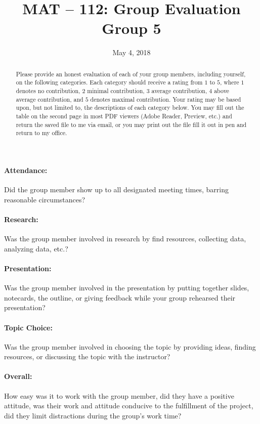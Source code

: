 \documentclass{article}
\title{MAT -- 112: Group Evaluation\\
\large{Group 5}}
\date{May 4, 2018}
\begin{document}
\maketitle

\begin{abstract}
Please provide an honest evaluation of each of your group members, including yourself, on the following categories. Each category should receive a rating from $1$ to $5$, where $1$ denotes no contribution, $2$ minimal contribution, $3$ average contribution, $4$ above average contribution, and $5$ denotes maximal contribution.  Your rating may be based upon, but not limited to, the descriptions of each category below. You may fill out the table on the second page in most PDF viewers (Adobe Reader, Preview, etc.) and return the saved file to me via email, or you may print out the file fill it out in pen and return to my office. 
\end{abstract}

\paragraph*{Attendance:} Did the group member show up to all designated meeting times, barring reasonable circumstances?
\paragraph*{Research:} Was the group member involved in research by find resources, collecting data, analyzing data, etc.?
\paragraph*{Presentation:} Was the group member involved in the presentation by putting together slides, notecards, the outline, or giving feedback while your group rehearsed their presentation?
\paragraph*{Topic Choice:} Was the group member involved in choosing the topic by providing ideas, finding resources, or discussing the topic with the instructor?
\paragraph*{Overall:} How easy was it to work with the group member, did they have a positive attitude, was their work and attitude conducive to the fulfillment of the project, did they limit distractions during the group's work time?
\end{document}
